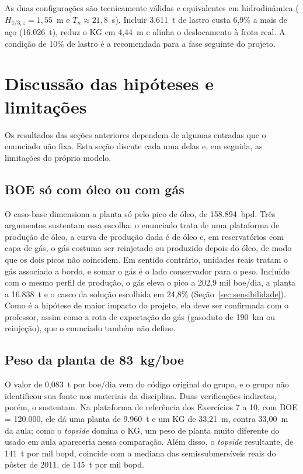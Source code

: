 \documentclass[11pt,a4paper]{article}
\newcommand{\Hz}{H_{1/3,z}}
\begin{document}
\begin{sintese}
As duas configurações são tecnicamente válidas e equivalentes em hidrodinâmica ($\Hz = 1{,}55$~m e
$T_n \approx 21{,}8$~s). Incluir 3.611~t de lastro custa 6,9\% a mais de aço (16.026~t), reduz o KG
em 4,44~m e alinha o deslocamento à frota real. A condição de 10\% de lastro é a recomendada para a
fase seguinte do projeto.
\end{sintese}

\section{Discussão das hipóteses e limitações}\label{sec:discussao}

Os resultados das seções anteriores dependem de algumas entradas que o enunciado não fixa. Esta
seção discute cada uma delas e, em seguida, as limitações do próprio modelo.

\subsection{BOE só com óleo ou com gás}\label{sec:disc-boe}

O caso-base dimensiona a planta só pelo pico de óleo, de 158.894~bpd. Três argumentos sustentam
essa escolha: o enunciado trata de uma plataforma de produção de óleo, a curva de produção dada é
de óleo e, em reservatórios com capa de gás, o gás costuma ser reinjetado ou produzido depois do
óleo, de modo que os dois picos não coincidem. Em sentido contrário, unidades reais tratam o gás
associado a bordo, e somar o gás é o lado conservador para o peso. Incluído com o mesmo perfil de
produção, o gás eleva o pico a 202,9 mil boe/dia, a planta a 16.838~t e o casco da solução escolhida
em 24,8\% (Seção~\ref{sec:sensibilidade}). Como é a hipótese de maior impacto do projeto, ela deve
ser confirmada com o professor, assim como a rota de exportação do gás (gasoduto de 190~km ou
reinjeção), que o enunciado também não define.

\subsection{Peso da planta de 83~kg/boe}\label{sec:disc-planta}

O valor de 0,083~t por boe/dia vem do código original do grupo, e o grupo não identificou sua fonte
nos materiais da disciplina. Duas verificações indiretas, porém, o sustentam. Na plataforma de
referência dos Exercícios 7 a 10, com BOE = 120.000, ele dá uma planta de 9.960~t e um KG de
33,21~m, contra 33,00~m da aula; como o \emph{topside} domina o KG, um peso de planta muito
diferente do usado em aula apareceria nessa comparação. Além disso, o \emph{topside} resultante, de
141~t por mil bopd, coincide com a mediana das semissubmersíveis reais do pôster de 2011, de 145~t
por mil bopd.
\end{document}
